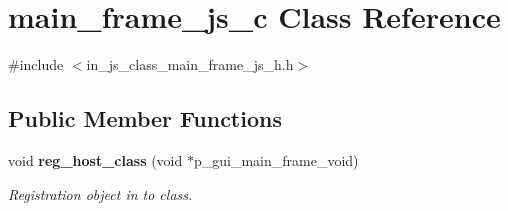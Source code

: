 \section{main\+\_\+frame\+\_\+js\+\_\+c Class Reference}
\label{classmain__frame__js__c}


{\ttfamily \#include $<$in\+\_\+js\+\_\+class\+\_\+main\+\_\+frame\+\_\+js\+\_\+h.\+h$>$}

\subsection*{Public Member Functions}
\begin{DoxyCompactItemize}
\item 
void \textbf{ reg\+\_\+host\+\_\+class} (void $\ast$p\+\_\+gui\+\_\+main\+\_\+frame\+\_\+void)
\begin{DoxyCompactList}\small\item\em Registration object in to class. \end{DoxyCompactList}\end{DoxyCompactItemize}
